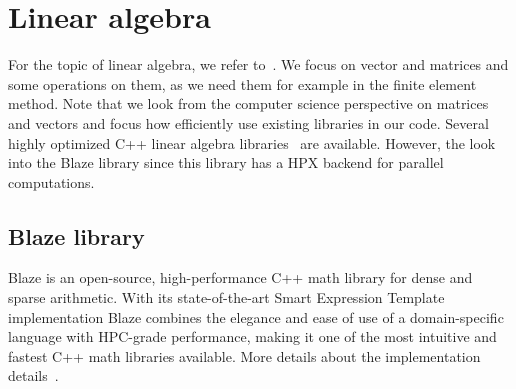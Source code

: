 %



\chapter{Linear algebra}
For the topic of linear algebra, we refer to~\cite{hefferonlinear,scheick1997linear}. We focus on vector and matrices and some operations on them, as we need them for example in the finite element method. Note that we look from the computer science perspective on matrices and vectors and focus how efficiently use existing libraries in our code. Several highly optimized C++ linear algebra libraries~\cite{wang2013augem,eigenweb,rupp2016viennacl,sanderson2016armadillo} are available. However, the look into the Blaze library since this library has a HPX backend for parallel computations. 


\section{Blaze library}
Blaze is an open-source, high-performance C++ math library for dense and sparse arithmetic. With its state-of-the-art Smart Expression Template implementation Blaze combines the elegance and ease of use of a domain-specific language with HPC-grade performance, making it one of the most intuitive and fastest C++ math libraries available. More details about the implementation details~\cite{doi:10.1137/110830125,6266939}.

